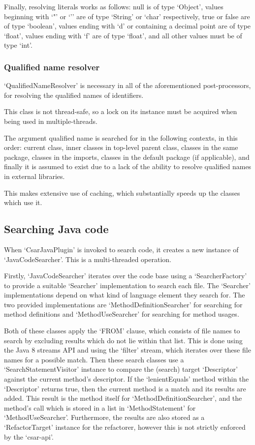 \documentclass[12pt, letterpaper]{article}
\begin{document}
Finally, resolving literals works as follows: null is of type `Object', values beginning with `"' or `'' are of type `String' or `char' respectively, true or false are of type `boolean', values ending with `d' or containing a decimal point are of type `float', values ending with `f' are of type `float', and all other values must be of type `int'.

\subsubsection{Qualified name resolver}
`QualifiedNameResolver' is necessary in all of the aforementioned post-processors, for resolving the qualified names of identifiers.

This class is not thread-safe, so a lock on its instance must be acquired when being used in multiple-threads.

The argument qualified name is searched for in the following contexts, in this order: current class, inner classes in top-level parent class, classes in the same package, classes in the imports, classes in the default package (if applicable), and finally it is assumed to exist due to a lack of the ability to resolve qualified names in external libraries.

This makes extensive use of caching, which substantially speeds up the classes which use it.

\subsection{Searching Java code}
When `CsarJavaPlugin' is invoked to search code, it creates a new instance of `JavaCodeSearcher'.
This is a multi-threaded operation.

Firstly, `JavaCodeSearcher' iterates over the code base using a `SearcherFactory' to provide a suitable `Searcher' implementation to search each file.
The `Searcher' implementations depend on what kind of language element they search for.
The two provided implementations are `MethodDefinitionSearcher' for searching for method definitions and `MethodUseSearcher' for searching for method usages.

Both of these classes apply the `FROM' clause, which consists of file names to search by excluding results which do not lie within that list.
This is done using the Java 8 streams API and using the `filter' stream, which iterates over these file names for a possible match.
Then these search classes use a `SearchStatementVisitor' instance to compare the (search) target `Descriptor' against the current method's descriptor.
If the `lenientEquals' method within the `Descriptor' returns true, then the current method is a match and its results are added.
This result is the method itself for `MethodDefinitionSearcher', and the method's call which is stored in a list in `MethodStatement' for `MethodUseSearcher'.
Furthermore, the results are also stored as a `RefactorTarget' instance for the refactorer, however this is not strictly enforced by the `csar-api'.
\end{document}

